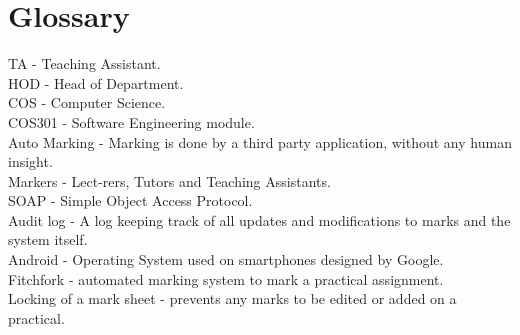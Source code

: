 \documentclass[12pt, a4paper]{scrartcl}
\begin{document}
		\section{Glossary}
		TA - Teaching Assistant.\\
		HOD - Head of Department.\\
		COS - Computer Science.\\
		COS301 - Software Engineering module.\\
		Auto Marking - Marking is done by a third party application, without any human insight.\\
		Markers - Lect-rers, Tutors and Teaching Assistants.\\
		SOAP - Simple Object Access Protocol.\\
		Audit log - A log keeping track of all updates and modifications to marks and the system itself.\\
		Android - Operating System used on smartphones designed by Google.\\
		Fitchfork - automated marking system to mark a practical assignment.\\
		Locking of a mark sheet - prevents any marks to be edited or added on a practical. 
\end{document}
